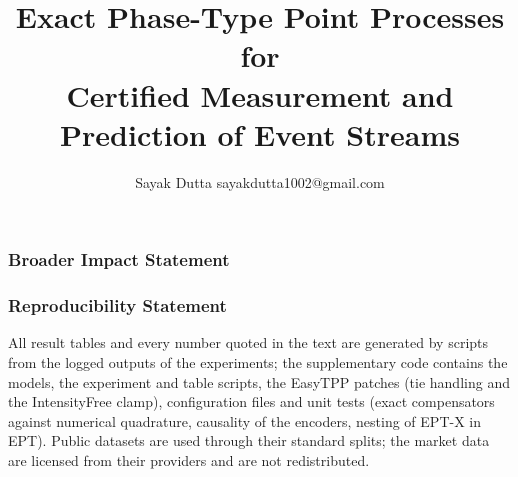 \documentclass[10pt]{article}
\title{Exact Phase-Type Point Processes for\\
Certified Measurement and Prediction of Event Streams}
\author{\name Sayak Dutta \email sayakdutta1002@gmail.com}
\theoremstyle{remark}
\begin{document}
\maketitle

\begin{abstract}

\end{abstract}










\subsubsection*{Broader Impact Statement}


\subsubsection*{Reproducibility Statement}
All result tables and every number quoted in the text are generated by scripts from the logged
outputs of the experiments; the supplementary code contains the models, the experiment and
table scripts, the EasyTPP patches (tie handling and the IntensityFree clamp), configuration
files and unit tests (exact compensators against numerical quadrature, causality of the
encoders, nesting of EPT-X in EPT). Public datasets are used through their standard splits;
the market data are licensed from their providers and are not redistributed.




\appendix

\end{document}
